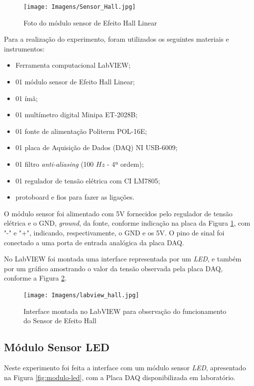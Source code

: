 \documentclass[a4paper]{instrumentacao}
\begin{document}
\begin{figure}[H]
\centering
\texttt{[image: Imagens/Sensor\_Hall.jpg]}
\caption{Foto do módulo sensor de Efeito Hall Linear}
\label{fig:efeito-hall}
\end{figure}

Para a realização do experimento, foram utilizados os seguintes materiais e instrumentos:

\begin{itemize}
	\item Ferramenta computacional LabVIEW;
	\item 01 módulo sensor de Efeito Hall Linear;
	\item 01 ímã;
	\item 01 multímetro digital Minipa ET-2028B;
	\item 01 fonte de alimentação Politerm POL-16E;
	\item 01 placa de Aquisição de Dados (DAQ) NI  USB-6009;
	\item 01 filtro \textit{anti-aliasing} (100 $Hz$ - 4ª ordem);
	\item 01 regulador de tensão elétrica com CI LM7805;
	\item protoboard e fios para fazer as ligações. 
\end{itemize}

O módulo sensor foi alimentado com 5V fornecidos pelo regulador de tensão elétrica e o GND, \textit{ground}, da fonte, conforme indicação na placa da Figura \ref{fig:efeito-hall}, com "-" e "+", indicando, respectivamente, o GND e os 5V. O pino de sinal foi conectado a uma porta de entrada analógica da placa DAQ.

No LabVIEW foi montada uma interface representada por um \textit{LED}, e também por um gráfico amostrando o valor da tensão observada pela placa DAQ, conforme a Figura \ref{fig:labview-hall}.

\begin{figure}[H]
\centering
\texttt{[image: Imagens/labview\_hall.jpg]}
\caption{Interface montada no LabVIEW para observação do funcionamento do Sensor de Efeito Hall}
\label{fig:labview-hall}
\end{figure}

\subsection{Módulo Sensor LED}
Neste experimento foi feita a interface com um módulo sensor \textit{LED}, apresentado na Figura \ref{fig:modulo-led}, com a Placa DAQ disponibilizada em laboratório.
\end{document}
